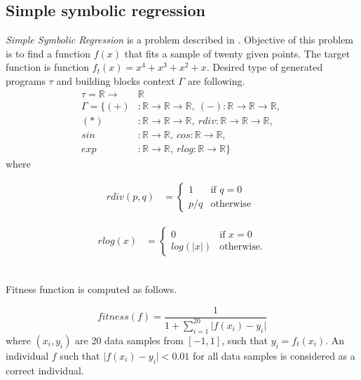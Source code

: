 \documentclass[conference]{IEEEtran}
\newcommand{\ar}{\rightarrow\xspace}
\newcommand{\Real}{\mathbb{R}}
\begin{document}
\subsection{Simple symbolic regression}
\textit{Simple Symbolic Regression} is a problem described
in \cite{koza92}. Objective of this problem is to 
find a function $f(x)$ that fits a sample
of twenty given points. The target function is 
function $f_{t}(x) = x^4 + x^3 + x^2 + x$.  
Desired type of generated programs $\tau$ and 
building blocks context $\Gamma$ are following.
\begin{align*}
\tau = \Real \ar &\Real\\
\Gamma = \{
  (+)  &: \Real \ar \Real \ar \Real    ,~ 
  (-)   : \Real \ar \Real \ar \Real    ,~\\
  (*)  &: \Real \ar \Real \ar \Real    ,~ 
  rdiv  : \Real \ar \Real \ar \Real    ,~\\
  sin  &: \Real \ar \Real              ,~ 
  cos   : \Real \ar \Real              ,~\\
  exp  &: \Real \ar \Real              ,~ 
  rlog  : \Real \ar \Real              \}
\end{align*}
where

\noindent
\begin{minipage}{.5\linewidth}
\begin{align*}
rdiv(p,q) &= \begin{cases} 1 &\mbox{if } q = 0 \\
p/q & \mbox{otherwise } \end{cases}  
\end{align*}
\end{minipage}%

\begin{minipage}{.5\linewidth}
\begin{align*}
rlog(x) &= \begin{cases} 0 &\mbox{if } x = 0 \\
log(\vert x\vert) & \mbox{otherwise}. \end{cases}
\end{align*}
\end{minipage}

~\\

Fitness function is computed as follows.

$$ fitness(f) =  \frac{1}{1+ \sum\limits_{i=1}^{20}{ \vert f(x_i)-y_i }\vert }  $$
where $(x_i,y_i)$ are 20 data samples from $[-1,1]$, such that $y_i = f_t(x_i)$.
An individual $f$ such that $\vert f(x_i)-y_i \vert < 0.01 $ for all data samples is 
considered as a correct individual.\\
\end{document}
